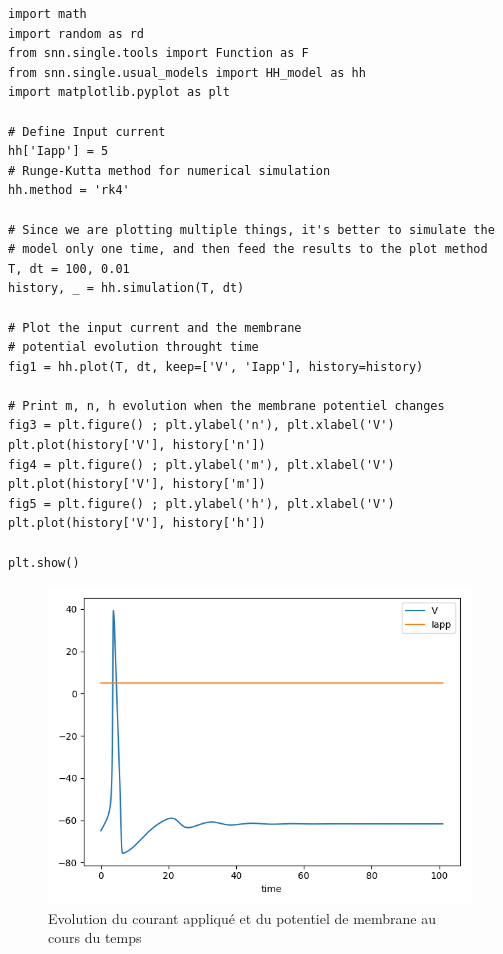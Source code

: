 \documentclass[12pt]{scrartcl}
\begin{document}
\begin{lstlisting}[caption = {Simulation du modèle 1}]
import math
import random as rd 
from snn.single.tools import Function as F
from snn.single.usual_models import HH_model as hh
import matplotlib.pyplot as plt

# Define Input current
hh['Iapp'] = 5
# Runge-Kutta method for numerical simulation
hh.method = 'rk4'

# Since we are plotting multiple things, it's better to simulate the
# model only one time, and then feed the results to the plot method
T, dt = 100, 0.01
history, _ = hh.simulation(T, dt)

# Plot the input current and the membrane 
# potential evolution throught time
fig1 = hh.plot(T, dt, keep=['V', 'Iapp'], history=history)

# Print m, n, h evolution when the membrane potentiel changes
fig3 = plt.figure() ; plt.ylabel('n'), plt.xlabel('V')
plt.plot(history['V'], history['n'])
fig4 = plt.figure() ; plt.ylabel('m'), plt.xlabel('V')
plt.plot(history['V'], history['m']) 
fig5 = plt.figure() ; plt.ylabel('h'), plt.xlabel('V')
plt.plot(history['V'], history['h']) 

plt.show()
\end{lstlisting}



\begin{figure}[!h]
\centering
\includegraphics[scale=0.5]{imgs/hh11.png}
\caption{Evolution du courant appliqué et du potentiel de membrane au cours du temps}
\label{hh11}
\end{figure}
\end{document}
